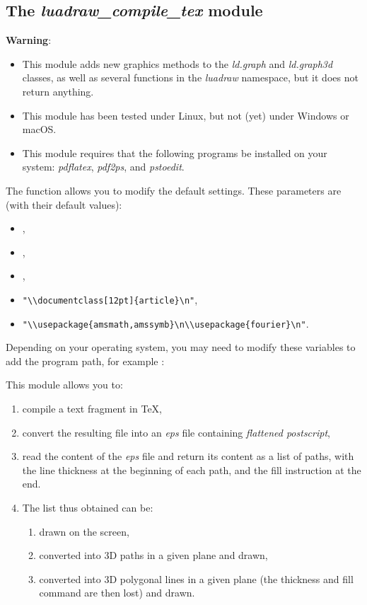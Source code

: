 \subsection{The \emph{luadraw\_compile\_tex} module}

\textbf{Warning}: 
\begin{itemize}
    \item This module adds new graphics methods to the \emph{ld.graph} and \emph{ld.graph3d} classes, as well as several functions in the \emph{luadraw} namespace, but it does not return anything.

    \item This module has been tested under Linux, but not (yet) under Windows or macOS.

    \item This module requires that the following programs be installed on your system: \emph{pdflatex}, \emph{pdf2ps}, and \emph{pstoedit}.
\end{itemize}

The  function allows you to modify the default settings. These parameters are (with their default values):
\begin{itemize}
    \item {},
    \item {},
    \item {},
    \item {}\verb|"\\documentclass[12pt]{article}\n"|,
    \item {}\verb|"\\usepackage{amsmath,amssymb}\n\\usepackage{fourier}\n"|.
\end{itemize}

Depending on your operating system, you may need to modify these variables to add the program path, for example :


This module allows you to:

\begin{enumerate}
\item compile a text fragment in TeX,
\item convert the resulting file into an \emph{eps} file containing \emph{flattened postscript},
\item read the content of the \emph{eps} file and return its content as a list of paths, with the line thickness at the beginning of each path, and the fill instruction at the end.
\item The list thus obtained can be:
    \begin{enumerate}
    \item drawn on the screen,
    \item converted into 3D paths in a given plane and drawn,
    \item converted into 3D polygonal lines in a given plane (the thickness and fill command are then lost) and drawn.
    \end{enumerate}
\end{enumerate}

